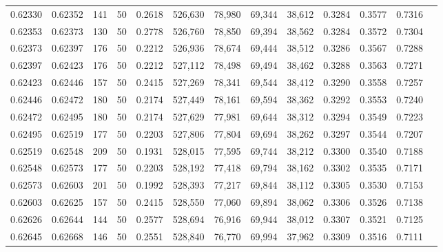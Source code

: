 \begin{tabular}{rrrrrrrrrrrrr}
0.62330 & 0.62352 &   141 &  50 &                                     0.2618 & 526,630 &  78,980 &  69,344 &  38,612 & 0.3284 & 0.3577 & 0.7316 \\
0.62353 & 0.62373 &   130 &  50 &                                     0.2778 & 526,760 &  78,850 &  69,394 &  38,562 & 0.3284 & 0.3572 & 0.7304 \\
0.62373 & 0.62397 &   176 &  50 &                                     0.2212 & 526,936 &  78,674 &  69,444 &  38,512 & 0.3286 & 0.3567 & 0.7288 \\
0.62397 & 0.62423 &   176 &  50 &                                     0.2212 & 527,112 &  78,498 &  69,494 &  38,462 & 0.3288 & 0.3563 & 0.7271 \\
0.62423 & 0.62446 &   157 &  50 &                                     0.2415 & 527,269 &  78,341 &  69,544 &  38,412 & 0.3290 & 0.3558 & 0.7257 \\
0.62446 & 0.62472 &   180 &  50 &                                     0.2174 & 527,449 &  78,161 &  69,594 &  38,362 & 0.3292 & 0.3553 & 0.7240 \\
0.62472 & 0.62495 &   180 &  50 &                                     0.2174 & 527,629 &  77,981 &  69,644 &  38,312 & 0.3294 & 0.3549 & 0.7223 \\
0.62495 & 0.62519 &   177 &  50 &                                     0.2203 & 527,806 &  77,804 &  69,694 &  38,262 & 0.3297 & 0.3544 & 0.7207 \\
0.62519 & 0.62548 &   209 &  50 &                                     0.1931 & 528,015 &  77,595 &  69,744 &  38,212 & 0.3300 & 0.3540 & 0.7188 \\
0.62548 & 0.62573 &   177 &  50 &                                     0.2203 & 528,192 &  77,418 &  69,794 &  38,162 & 0.3302 & 0.3535 & 0.7171 \\
0.62573 & 0.62603 &   201 &  50 &                                     0.1992 & 528,393 &  77,217 &  69,844 &  38,112 & 0.3305 & 0.3530 & 0.7153 \\
0.62603 & 0.62625 &   157 &  50 &                                     0.2415 & 528,550 &  77,060 &  69,894 &  38,062 & 0.3306 & 0.3526 & 0.7138 \\
0.62626 & 0.62644 &   144 &  50 &                                     0.2577 & 528,694 &  76,916 &  69,944 &  38,012 & 0.3307 & 0.3521 & 0.7125 \\
0.62645 & 0.62668 &   146 &  50 &                                     0.2551 & 528,840 &  76,770 &  69,994 &  37,962 & 0.3309 & 0.3516 & 0.7111 \\

\end{tabular}
